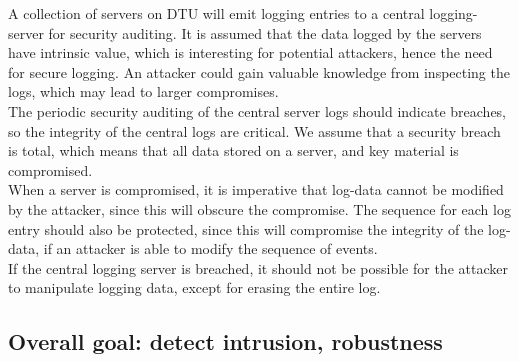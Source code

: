 A collection of servers on DTU will emit logging entries to a central logging-server for security auditing. It is assumed that the data logged by the servers have intrinsic value, which is interesting for potential attackers, hence the need for secure logging. An attacker could gain valuable knowledge from inspecting the logs, which may lead to larger compromises.
\\The periodic security auditing of the central server logs should indicate breaches, so the integrity of the central logs are critical.
We assume that a security breach is total, which means that all data stored on a server, and key material is compromised.
\\When a server is compromised, it is imperative that log-data cannot be modified by the attacker, since this will obscure the compromise.
The sequence for each log entry should also be protected, since this will compromise the integrity of the log-data, if an attacker is able to modify the sequence of events.
\\If the central logging server is breached, it should not be possible for the attacker to manipulate logging data, except for erasing the entire log.

\subsection{Overall goal: detect intrusion, robustness}

